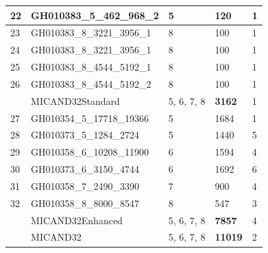 \begin{table}[]
\begin{tabular}{|l|l|l|l|l|}
		22          & GH010383\_5\_462\_968\_2     & 5             & 120                                                         & 1                                                     \\ \hline
		23          & GH010383\_8\_3221\_3956\_1   & 8             & 100                                                         & 1                                                     \\ \hline
		24          & GH010383\_8\_3221\_3956\_1   & 8             & 100                                                         & 1                                                     \\ \hline
		25          & GH010383\_8\_4544\_5192\_1   & 8             & 100                                                         & 1                                                     \\ \hline
		26          & GH010383\_8\_4544\_5192\_2   & 8             & 100                                                         & 1                                                     \\ \hline
		& MICAND32Standard             & 5, 6, 7,   8  & \textbf{3162}                                               & 1                                                     \\ \hline
		27          & GH010354\_5\_17718\_19366    & 5             & 1684                                                        & 1                                                     \\ \hline
		28          & GH010373\_5\_1284\_2724      & 5             & 1440                                                        & 5                                                     \\ \hline
		29          & GH010358\_6\_10208\_11900    & 6             & 1594                                                        & 4                                                     \\ \hline
		30          & GH010373\_6\_3150\_4744      & 6             & 1692                                                        & 6                                                     \\ \hline
		31          & GH010358\_7\_2490\_3390      & 7             & 900                                                         & 4                                                     \\ \hline
		32          & GH010358\_8\_8000\_8547      & 8             & 547                                                         & 3                                                     \\ \hline
		& MICAND32Enhanced             & 5, 6, 7,   8  & \textbf{7857}                                               & 4                                                     \\ \hline
		& MICAND32                     & 5, 6, 7,   8  & \textbf{11019}                                              & 2                                                     \\ \hline
	\end{tabular}
\end{table}
